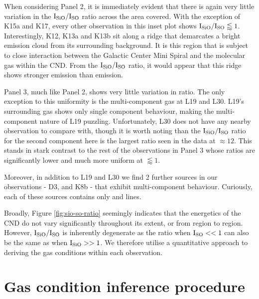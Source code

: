 \documentclass[twocolumn]{aastex631}
\begin{document}
When considering Panel 2, it is immediately evident that there is again very little variation in the $\mathrm{I}_{\ce{SiO}}/\mathrm{I}_{\ce{SO}}$ ratio across the area covered. With the exception of K15a and K17, every other observation in this inset plot shows $\mathrm{I}_{\ce{SiO}}/\mathrm{I}_{\ce{SO}} \lessapprox 1$. Interestingly, K12, K13a and K13b sit along a ridge that demarcates a bright  emission cloud from its surrounding background. It is this region that is subject to close interaction between the Galactic Center Mini Spiral and the molecular gas within the CND. From the $\mathrm{I}_{\ce{SiO}}/\mathrm{I}_{\ce{SO}}$ ratio, it would appear that this ridge shows stronger  emission than  emission. 

Panel 3, much like Panel 2, shows very little variation in ratio. The only exception to this uniformity is the multi-component gas at L19 and L30. L19's surrounding gas shows only single component behaviour, making the multi-component nature of L19 puzzling. Unfortunately, L30 does not have any nearby observation to compare with, though it is worth noting than the $\mathrm{I}_{\ce{SiO}}/\mathrm{I}_{\ce{SO}}$ ratio for the second component here is the largest ratio seen in the data at $\approx 12$. This stands in stark contrast to the rest of the observations in Panel 3 whose ratios are significantly lower and much more uniform at $\lessapprox 1$. 

Moreover, in addition to L19 and L30 we find 2 further sources in our observations - D3, and K8b - that exhibit multi-component behaviour. Curiously, each of these sources contains only  and  lines. 

Broadly, Figure \ref{fig:sio-so-ratio} seemingly indicates that the energetics of the CND do not vary significantly throughout its extent, or from region to region. However, $\mathrm{I}_{\ce{SiO}}/\mathrm{I}_{\ce{SO}}$ is inherently degenerate as the ratio when  $\mathrm{I}_{\ce{SO}} << 1$ can also be the same as when $\mathrm{I}_{\ce{SiO}} >> 1$. We therefore utilise a quantitative approach to deriving the gas conditions within each observation.


\section{Gas condition inference procedure} \label{sec:sim}
\end{document}
